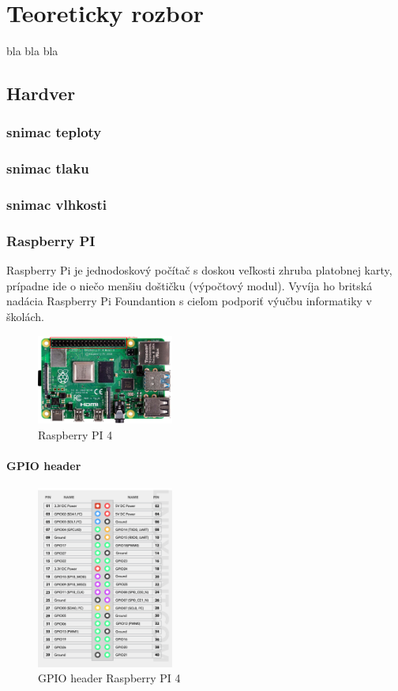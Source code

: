 \chapter{Teoreticky rozbor}
bla bla bla

\section{Hardver}
\subsection{snimac teploty}
\subsection{snimac tlaku}
\subsection{snimac vlhkosti}
\subsection{Raspberry PI}
Raspberry Pi je jednodoskový počítač s doskou veľkosti zhruba platobnej karty, prípadne ide o niečo menšiu doštičku (výpočtový modul). Vyvíja ho britská nadácia Raspberry Pi Foundantion s cieľom podporiť výučbu informatiky v školách.
\begin{figure}[h!]
    \centering
    \includegraphics[width=0.4\textwidth]{obrazky/RPi.png}
    \caption{Raspberry PI 4}
\end{figure}
\subsubsection{GPIO header}
\begin{figure}[h!]
    \centering
    \includegraphics[width=0.4\textwidth]{obrazky/gpio_header.png}
    \caption{GPIO header Raspberry PI 4}
\end{figure}
